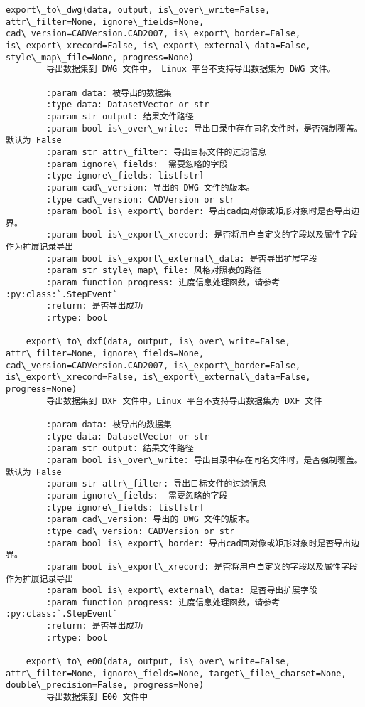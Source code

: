 \documentclass[11pt]{article}
\begin{document}
\begin{Verbatim}[commandchars=\\\{\}]
    export\_to\_dwg(data, output, is\_over\_write=False, attr\_filter=None, ignore\_fields=None, cad\_version=CADVersion.CAD2007, is\_export\_border=False, is\_export\_xrecord=False, is\_export\_external\_data=False, style\_map\_file=None, progress=None)
        导出数据集到 DWG 文件中， Linux 平台不支持导出数据集为 DWG 文件。
        
        :param data: 被导出的数据集
        :type data: DatasetVector or str
        :param str output: 结果文件路径
        :param bool is\_over\_write: 导出目录中存在同名文件时，是否强制覆盖。默认为 False
        :param str attr\_filter: 导出目标文件的过滤信息
        :param ignore\_fields:  需要忽略的字段
        :type ignore\_fields: list[str]
        :param cad\_version: 导出的 DWG 文件的版本。
        :type cad\_version: CADVersion or str
        :param bool is\_export\_border: 导出cad面对像或矩形对象时是否导出边界。
        :param bool is\_export\_xrecord: 是否将用户自定义的字段以及属性字段作为扩展记录导出
        :param bool is\_export\_external\_data: 是否导出扩展字段
        :param str style\_map\_file: 风格对照表的路径
        :param function progress: 进度信息处理函数，请参考 :py:class:`.StepEvent`
        :return: 是否导出成功
        :rtype: bool
    
    export\_to\_dxf(data, output, is\_over\_write=False, attr\_filter=None, ignore\_fields=None, cad\_version=CADVersion.CAD2007, is\_export\_border=False, is\_export\_xrecord=False, is\_export\_external\_data=False, progress=None)
        导出数据集到 DXF 文件中，Linux 平台不支持导出数据集为 DXF 文件
        
        :param data: 被导出的数据集
        :type data: DatasetVector or str
        :param str output: 结果文件路径
        :param bool is\_over\_write: 导出目录中存在同名文件时，是否强制覆盖。默认为 False
        :param str attr\_filter: 导出目标文件的过滤信息
        :param ignore\_fields:  需要忽略的字段
        :type ignore\_fields: list[str]
        :param cad\_version: 导出的 DWG 文件的版本。
        :type cad\_version: CADVersion or str
        :param bool is\_export\_border: 导出cad面对像或矩形对象时是否导出边界。
        :param bool is\_export\_xrecord: 是否将用户自定义的字段以及属性字段作为扩展记录导出
        :param bool is\_export\_external\_data: 是否导出扩展字段
        :param function progress: 进度信息处理函数，请参考 :py:class:`.StepEvent`
        :return: 是否导出成功
        :rtype: bool
    
    export\_to\_e00(data, output, is\_over\_write=False, attr\_filter=None, ignore\_fields=None, target\_file\_charset=None, double\_precision=False, progress=None)
        导出数据集到 E00 文件中
        

\end{Verbatim}
\end{document}
